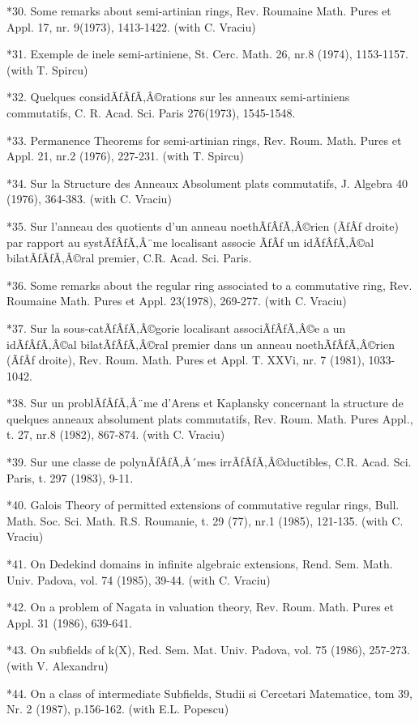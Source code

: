 \documentclass[12pt]{article}
\theoremstyle{plain}
\theoremstyle{definition}
\numberwithin{equation}{section}
\begin{document}
*30.    Some remarks about semi-artinian rings, Rev. Roumaine Math. Pures et Appl. 17, nr. 9(1973), 1413-1422. (with C. Vraciu) 

*31.    Exemple de inele semi-artiniene, St. Cerc. Math. 26, nr.8 (1974), 1153-1157. (with T. Spircu) 

*32.    Quelques considÃƒÂƒÃ‚Â©rations sur les anneaux semi-artiniens commutatifs, C. R. Acad. Sci. Paris 276(1973), 1545-1548. 

*33.    Permanence Theorems for semi-artinian rings, Rev. Roum. Math. Pures et Appl. 21, nr.2 (1976), 227-231. (with T. Spircu)
 
*34.    Sur la Structure des Anneaux Absolument plats commutatifs, J. Algebra 40 (1976), 364-383. (with C. Vraciu) 

*35.    Sur l'anneau des quotients d'un anneau noethÃƒÂƒÃ‚Â©rien (ÃƒÂƒ  droite) par rapport au systÃƒÂƒÃ‚Â¨me localisant associe ÃƒÂƒ  un idÃƒÂƒÃ‚Â©al bilatÃƒÂƒÃ‚Â©ral premier, C.R. Acad. Sci. Paris. 

*36.    Some remarks about the regular ring associated to a commutative ring, Rev. Roumaine Math. Pures et Appl. 23(1978), 269-277. (with C. Vraciu) 

*37.    Sur la sous-catÃƒÂƒÃ‚Â©gorie localisant associÃƒÂƒÃ‚Â©e a un idÃƒÂƒÃ‚Â©al bilatÃƒÂƒÃ‚Â©ral premier dans un anneau noethÃƒÂƒÃ‚Â©rien (ÃƒÂƒ  droite), Rev. Roum. Math. Pures et Appl. T. XXVi, nr. 7 (1981), 1033-1042. 

*38.    Sur un problÃƒÂƒÃ‚Â¨me d'Arens et Kaplansky concernant la structure de quelques anneaux absolument plats commutatifs, Rev. Roum. Math. Pures Appl., t. 27, nr.8 (1982), 867-874. (with C. Vraciu) 

*39.    Sur une classe de polynÃƒÂƒÃ‚Â´mes irrÃƒÂƒÃ‚Â©ductibles, C.R. Acad. Sci. Paris, t. 297 (1983), 9-11. 

*40.    Galois Theory of permitted extensions of commutative regular rings, Bull. Math. Soc. Sci. Math. R.S. Roumanie, t. 29 (77), nr.1 (1985), 121-135. (with C. Vraciu) 

*41.    On Dedekind domains in infinite algebraic extensions, Rend. Sem. Math. Univ. Padova, vol. 74 (1985), 39-44. (with C. Vraciu) 

*42.    On a problem of Nagata in valuation theory, Rev. Roum. Math. Pures et Appl. 31 (1986), 639-641. 

*43.    On subfields of k(X), Red. Sem. Mat. Univ. Padova, vol. 75 (1986), 257-273. (with V. Alexandru) 

*44.    On a class of intermediate Subfields, Studii si Cercetari Matematice, tom 39, Nr. 2 (1987), p.156-162. (with E.L. Popescu) 
\end{document}
